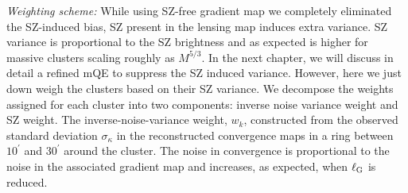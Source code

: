 {\it Weighting scheme:} While using SZ-free gradient map we completely eliminated the SZ-induced bias, SZ present in the lensing map induces extra variance.
SZ variance is proportional to the SZ brightness and as expected is higher for massive clusters scaling roughly as $M^{5/3}$.
In the next chapter, we will discuss in detail a refined mQE to suppress the SZ induced variance. 
However, here we just down weigh the clusters based on their SZ variance.
We decompose the weights assigned for each cluster into two components: inverse noise variance weight and SZ weight. 
 The inverse-noise-variance weight, $w_{k}$, constructed from the observed standard deviation $\sigma_{\kappa}$ in the reconstructed \sptpol{} convergence maps in a ring between $10^{\prime}$ and $30^{\prime}$ around the cluster. 
The noise in convergence is proportional to the noise in the associated gradient map and increases, as expected, when $\ell_{\rm G}$ is reduced.


